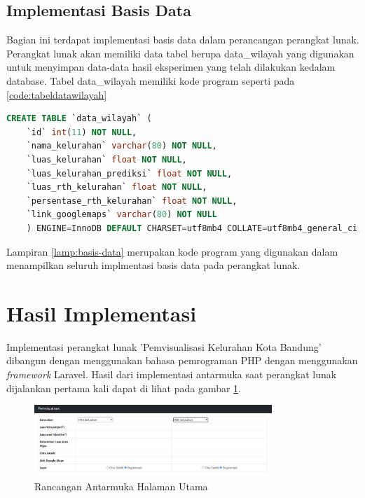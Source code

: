 \subsection{Implementasi Basis Data}
\label{subsec:implmentasiBasisData}
Bagian ini terdapat implementasi basis data dalam perancangan perangkat lunak. Perangkat lunak akan memiliki data tabel berupa data\_wilayah yang digunakan untuk menyimpan data-data hasil eksperimen yang telah dilakukan kedalam database. Tabel data\_wilayah memiliki kode program seperti pada \ref{code:tabeldatawilayah}

\begin{lstlisting}[language=SQL, caption=Implementasi Tabel data\_wilayah,label={code:tabeldatawilayah}]
	CREATE TABLE `data_wilayah` (
	`id` int(11) NOT NULL,
	`nama_kelurahan` varchar(80) NOT NULL,
	`luas_kelurahan` float NOT NULL,
	`luas_kelurahan_prediksi` float NOT NULL,
	`luas_rth_kelurahan` float NOT NULL,
	`persentase_rth_kelurahan` float NOT NULL,
	`link_googlemaps` varchar(80) NOT NULL
	) ENGINE=InnoDB DEFAULT CHARSET=utf8mb4 COLLATE=utf8mb4_general_ci;
\end{lstlisting}

Lampiran \ref{lamp:basis-data} merupakan kode program yang digunakan dalam menampilkan seluruh implmentasi basis data pada perangkat lunak.

\section{Hasil Implementasi}
\label{sec:hasil-implementasi}
Implementasi perangkat lunak 'Pemvisualisasi Kelurahan Kota Bandung' dibangun dengan menggunakan bahasa pemrograman PHP dengan menggunakan \textit{framework} Laravel. Hasil  dari implementasi antarmuka saat perangkat lunak dijalankan pertama kali dapat di lihat pada gambar \ref{fig:home1}.
\begin{figure}[H]
	\centering
	\includegraphics[width=0.8\textwidth]{Gambar/home1.png}
	\caption{Rancangan Antarmuka Halaman Utama}
	\label{fig:home1}
\end{figure}

